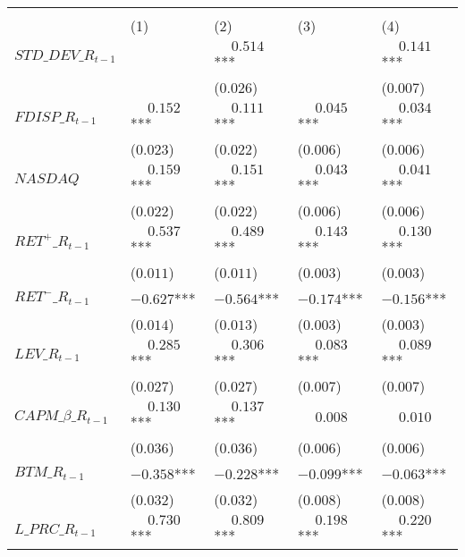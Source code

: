 \begin{table}
\begin{tabular}[t]{>{\raggedright\arraybackslash}p{5.1cm}>{\raggedright\arraybackslash}p{2.1cm}>{\raggedright\arraybackslash}p{2.1cm}>{\raggedright\arraybackslash}p{2.1cm}>{\raggedright\arraybackslash}p{2.1cm}}
\multicolumn{1}{c}{ } & \multicolumn{2}{c}{$L\_TURN_t$} & \multicolumn{2}{c}{$L\_TURN\_R_t$} \\
\cmidrule(l{3pt}r{3pt}){2-3} \cmidrule(l{3pt}r{3pt}){4-5}
 & \phantom{-}(1) & \phantom{-}(2) & \phantom{-}(3) & \phantom{-}(4)\\
\midrule
$STD\_DEV\_R_{t-1}$ &  & $\phantom{-}0.514$*** &  & $\phantom{-}0.141$***\\
 &  & (\phantom{-}$0.026$) &  & (\phantom{-}$0.007$)\\
\addlinespace
$FDISP\_R_{t-1}$ & $\phantom{-}0.152$*** & $\phantom{-}0.111$*** & $\phantom{-}0.045$*** & $\phantom{-}0.034$***\\
 & (\phantom{-}$0.023$) & (\phantom{-}$0.022$) & (\phantom{-}$0.006$) & (\phantom{-}$0.006$)\\
\addlinespace
$NASDAQ$ & $\phantom{-}0.159$*** & $\phantom{-}0.151$*** & $\phantom{-}0.043$*** & $\phantom{-}0.041$***\\
 & (\phantom{-}$0.022$) & (\phantom{-}$0.022$) & (\phantom{-}$0.006$) & (\phantom{-}$0.006$)\\
\addlinespace
$RET^+\_R_{t-1}$ & $\phantom{-}0.537$*** & $\phantom{-}0.489$*** & $\phantom{-}0.143$*** & $\phantom{-}0.130$***\\
 & (\phantom{-}$0.011$) & (\phantom{-}$0.011$) & (\phantom{-}$0.003$) & \vphantom{1} (\phantom{-}$0.003$)\\
\addlinespace
$RET^-\_R_{t-1}$ & $-0.627$*** & $-0.564$*** & $-0.174$*** & $-0.156$***\\
 & (\phantom{-}$0.014$) & (\phantom{-}$0.013$) & (\phantom{-}$0.003$) & (\phantom{-}$0.003$)\\
\addlinespace
$LEV\_R_{t-1}$ & $\phantom{-}0.285$*** & $\phantom{-}0.306$*** & $\phantom{-}0.083$*** & $\phantom{-}0.089$***\\
 & (\phantom{-}$0.027$) & (\phantom{-}$0.027$) & (\phantom{-}$0.007$) & (\phantom{-}$0.007$)\\
\addlinespace
$CAPM\_\beta\_R_{t-1}$ & $\phantom{-}0.130$*** & $\phantom{-}0.137$*** & $\phantom{-}0.008$ & $\phantom{-}0.010$\\
 & (\phantom{-}$0.036$) & (\phantom{-}$0.036$) & (\phantom{-}$0.006$) & (\phantom{-}$0.006$)\\
\addlinespace
$BTM\_R_{t-1}$ & $-0.358$*** & $-0.228$*** & $-0.099$*** & $-0.063$***\\
 & (\phantom{-}$0.032$) & (\phantom{-}$0.032$) & (\phantom{-}$0.008$) & (\phantom{-}$0.008$)\\
\addlinespace
$L\_PRC\_R_{t-1}$ & $\phantom{-}0.730$*** & $\phantom{-}0.809$*** & $\phantom{-}0.198$*** & $\phantom{-}0.220$***\\

\end{tabular}
\end{table}
